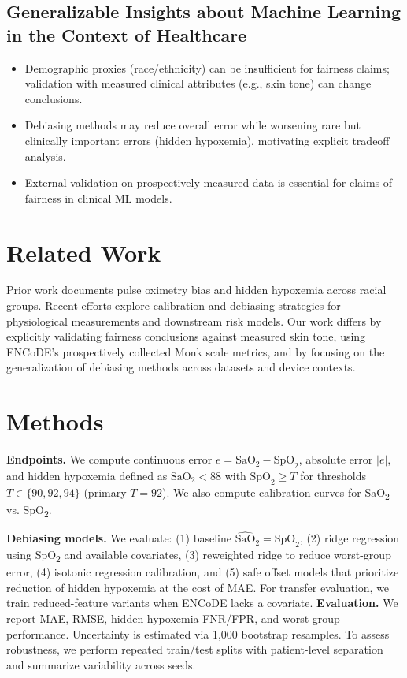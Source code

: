\documentclass[pmlr]{jmlr}%
\begin{document}
\subsection*{Generalizable Insights about Machine Learning in the Context of Healthcare}
\begin{itemize}
\item Demographic proxies (race/ethnicity) can be insufficient for fairness claims; validation with measured clinical attributes (e.g., skin tone) can change conclusions.
\item Debiasing methods may reduce overall error while worsening rare but clinically important errors (hidden hypoxemia), motivating explicit tradeoff analysis.
\item External validation on prospectively measured data is essential for claims of fairness in clinical ML models.
\end{itemize}

\section{Related Work}

Prior work documents pulse oximetry bias and hidden hypoxemia across racial groups\cite{pulseox-bias,hidden-hypoxemia}. Recent efforts explore calibration and debiasing strategies for physiological measurements and downstream risk models\cite{calibration-clinical,ml-fairness-health}. Our work differs by explicitly validating fairness conclusions against measured skin tone, using ENCoDE's prospectively collected Monk scale metrics, and by focusing on the generalization of debiasing methods across datasets and device contexts.

\section{Methods}

\textbf{Endpoints.} We compute continuous error $e = \text{SaO}_2 - \text{SpO}_2$, absolute error $|e|$, and hidden hypoxemia defined as $\text{SaO}_2 < 88$ with $\text{SpO}_2 \geq T$ for thresholds $T \in \{90,92,94\}$ (primary $T=92$). We also compute calibration curves for SaO\textsubscript{2} vs. SpO\textsubscript{2}.

\textbf{Debiasing models.} We evaluate: (1) baseline $\hat{\text{SaO}}_2 = \text{SpO}_2$, (2) ridge regression using SpO\textsubscript{2} and available covariates, (3) reweighted ridge to reduce worst-group error, (4) isotonic regression calibration, and (5) safe offset models that prioritize reduction of hidden hypoxemia at the cost of MAE. For transfer evaluation, we train reduced-feature variants when ENCoDE lacks a covariate.\n
\textbf{Evaluation.} We report MAE, RMSE, hidden hypoxemia FNR/FPR, and worst-group performance. Uncertainty is estimated via 1,000 bootstrap resamples. To assess robustness, we perform repeated train/test splits with patient-level separation and summarize variability across seeds.
\end{document}
